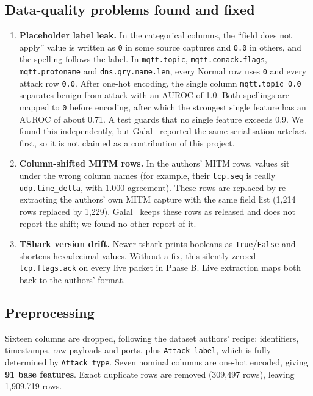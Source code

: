 \subsection{Data-quality problems found and fixed}\label{sec:dataquality}
\begin{enumerate}
  \item \textbf{Placeholder label leak.} In the categorical columns, the ``field does not apply'' value is written as \texttt{0} in some source captures and \texttt{0.0} in others, and the spelling follows the label. In \texttt{mqtt.topic}, \texttt{mqtt.conack.flags}, \texttt{mqtt.protoname} and \texttt{dns.qry.name.len}, every Normal row uses \texttt{0} and every attack row \texttt{0.0}. After one-hot encoding, the single column \texttt{mqtt.topic\_0.0} separates benign from attack with an AUROC of 1.0. Both spellings are mapped to \texttt{0} before encoding, after which the strongest single feature has an AUROC of about 0.71. A test guards that no single feature exceeds 0.9. We found this independently, but Galal~\cite{galal2026provenance} reported the same serialisation artefact first, so it is not claimed as a contribution of this project.
  \item \textbf{Column-shifted MITM rows.} In the authors' MITM rows, values sit under the wrong column names (for example, their \texttt{tcp.seq} is really \texttt{udp.time\_delta}, with 1.000 agreement). These rows are replaced by re-extracting the authors' own MITM capture with the same field list (1{,}214 rows replaced by 1{,}229). Galal~\cite{galal2026provenance} keeps these rows as released and does not report the shift; we found no other report of it.
  \item \textbf{TShark version drift.} Newer tshark prints booleans as \texttt{True}/\texttt{False} and shortens hexadecimal values. Without a fix, this silently zeroed \texttt{tcp.flags.ack} on every live packet in Phase B. Live extraction maps both back to the authors' format.
\end{enumerate}

\subsection{Preprocessing}
Sixteen columns are dropped, following the dataset authors' recipe: identifiers, timestamps, raw payloads and ports, plus \texttt{Attack\_label}, which is fully determined by \texttt{Attack\_type}. Seven nominal columns are one-hot encoded, giving \textbf{91 base features}. Exact duplicate rows are removed (309{,}497 rows), leaving 1{,}909{,}719 rows.

